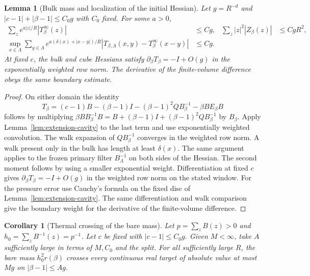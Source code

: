 \documentclass[11pt]{article}
\newtheorem{lemma}[theorem]{Lemma}
\newtheorem{corollary}[theorem]{Corollary}
\theoremstyle{definition}
\begin{document}
\begin{lemma}[Bulk mass and localization of the initial Hessian]
\label{lem:initial-hessian-comparison}
Let \(g=R^{-d}\) and \(|c-1|+|\beta-1|\le C_0g\) with \(C_0\)
fixed. For some \(a>0\),
\begin{equation}
 \begin{aligned}
 \sum_z e^{a|z|/R}|T_\beta^\infty(z)|&\le Cg, &
 \sum_z |z|^2 |Z_\beta(z)|&\le Cg R^2,\\
 \sup_{x\in\Lambda}\sum_{y\in\Lambda}
 e^{a(\delta(x)+|x-y|)/R}
 |T_{\beta,\Lambda}(x,y)-T_\beta^\infty(x-y)|&\le Cg .
 \end{aligned}
\end{equation}
At fixed \(c\), the bulk and cube Hessians satisfy
\(\partial_\beta T_\beta=-I+O(g)\) in the exponentially weighted row norm. The derivative of the
finite-volume difference obeys the same boundary estimate.
\end{lemma}

\begin{proof}
On either domain the identity
\begin{equation}
 T_\beta=(c-1)B-(\beta-1)I-(\beta-1)^2 QB_\beta^{-1}
             -\beta B E_\beta B
\end{equation}
follows by multiplying
\(\beta B B_\beta^{-1}B=B+(\beta-1)I+
(\beta-1)^2QB_\beta^{-1}\) by \(B_\beta\).
Apply Lemma~\ref{lem:extension-cavity} to the last term and use
exponentially weighted convolution.
The walk expansion of \(QB_\beta^{-1}\) converges in the
weighted row norm. A walk present only in the bulk has length at
least \(\delta(x)\). The same argument applies to the frozen primary
filter \(B_\Lambda^{-1}\) on both sides of the Hessian.
The second moment follows by using a smaller exponential weight.
Differentiation at fixed \(c\) gives \(\partial_\beta T_\beta=-I+O(g)\)
in the weighted row norm on the stated window. For the pressure error
use Cauchy's formula on the fixed disc of Lemma~\ref{lem:extension-cavity}.
The same differentiation and walk comparison give the boundary
weight for the derivative of the finite-volume difference.
\end{proof}

\begin{corollary}[Thermal crossing of the bare mass]
\label{cor:bare-thermal-crossing}
Let \(p=\sum_z B(z)>0\) and \(h_0=\sum_z B^{-1}(z)=p^{-1}\). Let \(c\) be
fixed with \(|c-1|\le C_0 g\). Given \(M<\infty\), take \(A\)
sufficiently large in terms of \(M,C_0\) and the split.
For all sufficiently large \(R\), the bare mass \(h_0^2r(\beta)\)
crosses every continuous real target of absolute value at most
\(Mg\) on \(|\beta-1|\le Ag\).
\end{corollary}
\end{document}
